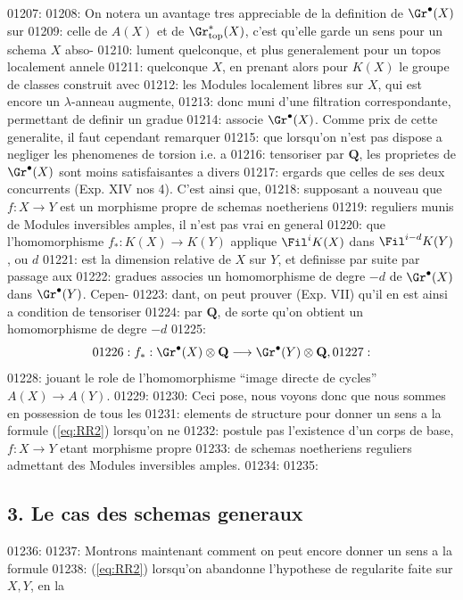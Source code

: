 01207: 
01208: On notera un avantage tres appreciable de la definition de $\Gr^{\bullet}(X)$ sur
01209: celle de $A(X)$ et de $\Gr^*_{\mathrm{top}}(X)$, c'est qu'elle garde un sens pour un schema $X$ abso-
01210: lument quelconque, et plus generalement pour un topos localement annele
01211: quelconque $X$, en prenant alors pour $K(X)$ le groupe de classes construit avec
01212: les Modules localement libres sur $X$, qui est encore un $\lambda$-anneau augmente,
01213: donc muni d'une filtration correspondante, permettant de definir un gradue
01214: associe $\Gr^{\bullet}(X)$. Comme prix de cette generalite, il faut cependant remarquer
01215: que lorsqu'on n'est pas dispose a negliger les phenomenes de torsion i.e. a
01216: tensoriser par $\mathbf{Q}$, les proprietes de $\Gr^{\bullet}(X)$ sont moins satisfaisantes a divers
01217: ergards que celles de ses deux concurrents (Exp. XIV nos 4). C'est ainsi que,
01218: supposant a nouveau que $f: X \to Y$ est un morphisme propre de schemas noetheriens
01219: reguliers munis de Modules inversibles amples, il n'est pas vrai en general
01220: que l'homomorphisme $f_{*}: K(X) \to K(Y)$ applique $\Fil^i K(X)$ dans $\Fil^{i-d} K(Y)$, ou $d$
01221: est la dimension relative de $X$ sur $Y$, et definisse par suite par passage aux
01222: gradues associes un homomorphisme de degre $-d$ de $\Gr^{\bullet}(X)$ dans $\Gr^{\bullet}(Y)$. Cepen-
01223: dant, on peut prouver (Exp. VII) qu'il en est ainsi a condition de tensoriser
01224: par $\mathbf{Q}$, de sorte qu'on obtient un homomorphisme de degre $-d$
01225: \begin{equation}
01226: f_{*}: \Gr^{\bullet}(X) \otimes \mathbf{Q} \longrightarrow \Gr^{\bullet}(Y) \otimes \mathbf{Q},
01227: \end{equation}
01228: jouant le role de l'homomorphisme ``image directe de cycles'' $A(X) \to A(Y)$.
01229: 
01230: Ceci pose, nous voyons donc que nous sommes en possession de tous les
01231: elements de structure pour donner un sens a la formule (\ref{eq:RR2}) lorsqu'on ne
01232: postule pas l'existence d'un corps de base, $f: X \to Y$ etant morphisme propre
01233: de schemas noetheriens reguliers admettant des Modules inversibles amples.
01234: 
01235: \subsection*{3. Le cas des schemas generaux}
01236: 
01237: Montrons maintenant comment on peut encore donner un sens a la formule
01238: (\ref{eq:RR2}) lorsqu'on abandonne l'hypothese de regularite faite sur $X, Y$, en la
